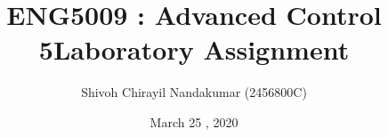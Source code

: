 \documentclass{l4proj}
\begin{document}
\title{ENG5009 : Advanced Control 5\newline Laboratory Assignment\newline} %
\author{Shivoh Chirayil Nandakumar (2456800C)}
\date{March 25 , 2020}

\maketitle




\tableofcontents

%
%
%

%
%
%
%
\end{document}
